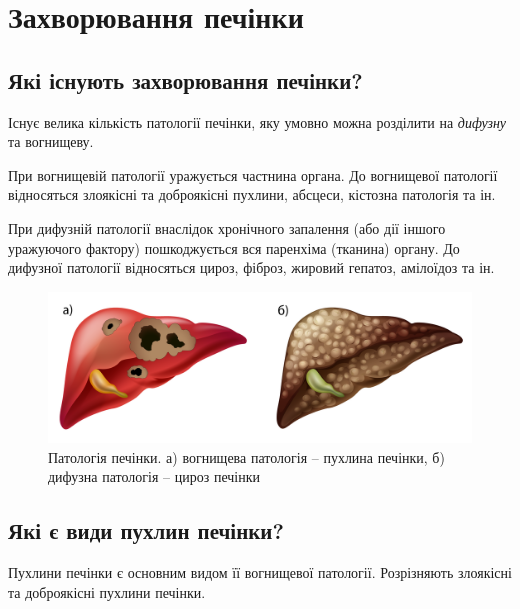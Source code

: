 \chapter{Захворювання печінки}

\section{Які існують захворювання печінки?}

Існує велика кількість патології печінки, яку умовно можна розділити на \textit{дифузну} та вогнищеву. 

При вогнищевій патології уражується частнина органа. До вогнищевої патології відносяться злоякісні та доброякісні пухлини, абсцеси, кістозна патологія та ін.

При дифузній патології внаслідок хронічного запалення (або дії іншого уражуючого фактору) пошкоджується вся паренхіма (тканина) органу. До дифузної патології відносяться цироз, фіброз, жировий гепатоз, амілоїдоз та ін.

\begin{figure}
  \includegraphics{Figures/Liver diseases_Diffuse and Nodular.png}
  \caption{Патологія печінки. а) вогнищева патологія -- пухлина печінки, б) дифузна патологія -- цироз печінки }
  \label{fig:textfig}
\end{figure}

\section{Які є види пухлин печінки?}

Пухлини печінки є основним видом її вогнищевої патології.
Розрізняють злоякісні та доброякісні пухлини печінки.

